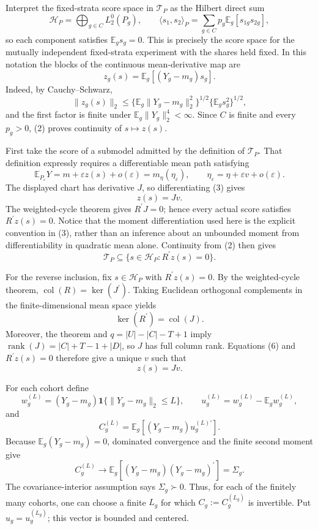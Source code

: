 Interpret the fixed-strata score space in \(\mathcal T_P\) as the Hilbert direct sum
\[
\mathcal H_P=\bigoplus_{g\in C}L_2^0(P_g),
\qquad
\langle s_1,s_2\rangle_P
=\sum_{g\in C}p_g\mathbb E_g[s_{1g}s_{2g}],
\]
so each component satisfies \(\mathbb E_gs_g=0\).  This is precisely the score space for the mutually independent fixed-strata experiment with the shares held fixed.  In this notation the blocks of the continuous mean-derivative map are
\[
z_g(s)=\mathbb E_g[(Y_g-m_g)s_g].                                      \tag{1}
\]
Indeed, by Cauchy--Schwarz,
\[
\|z_g(s)\|_2
\le \{\mathbb E_g\|Y_g-m_g\|_2^2\}^{1/2}
     \{\mathbb E_gs_g^2\}^{1/2},                                      \tag{2}
\]
and the first factor is finite under \(\mathbb E_g\|Y_g\|_2^4<\infty\).  Since \(C\) is finite and every \(p_g>0\), (2) proves continuity of \(s\mapsto z(s)\).

First take the score of a submodel admitted by the definition of \(\mathcal T_P\).  That definition expressly requires a differentiable mean path satisfying
\[
\mathbb E_{P_\varepsilon}Y
=m+\varepsilon z(s)+o(\varepsilon)
=m_\eta(\eta_\varepsilon),
\qquad
\eta_\varepsilon=\eta+\varepsilon v+o(\varepsilon).                   \tag{3}
\]
The displayed chart has derivative \(J\), so differentiating (3) gives
\[
z(s)=Jv.                                                               \tag{4}
\]
The weighted-cycle theorem gives \(R^{\prime}J=0\); hence every actual score satisfies \(R^{\prime}z(s)=0\).  Notice that the moment differentiation used here is the explicit convention in (3), rather than an inference about an unbounded moment from differentiability in quadratic mean alone.  Continuity from (2) then gives
\[
\mathcal T_P\subseteq\{s\in\mathcal H_P:R^{\prime}z(s)=0\}.           \tag{5}
\]

For the reverse inclusion, fix \(s\in\mathcal H_P\) with \(R^{\prime}z(s)=0\).  By the weighted-cycle theorem,
\(\operatorname{col}(R)=\ker(J^{\prime})\).  Taking Euclidean orthogonal complements in the finite-dimensional mean space yields
\[
\ker(R^{\prime})=\operatorname{col}(J).                                \tag{6}
\]
Moreover, the theorem and \(q=|U|-|C|-T+1\) imply
\(\operatorname{rank}(J)=|C|+T-1+|D|\), so \(J\) has full column rank.  Equations (6) and \(R^{\prime}z(s)=0\) therefore give a unique \(v\) such that
\[
z(s)=Jv.                                                               \tag{7}
\]

For each cohort define
\[
w_g^{(L)}=(Y_g-m_g)\mathbf 1\{\|Y_g-m_g\|_2\le L\},
\qquad
u_g^{(L)}=w_g^{(L)}-\mathbb E_gw_g^{(L)},
\]
and
\[
C_g^{(L)}=\mathbb E_g[(Y_g-m_g)u_g^{(L)\prime}].                        \tag{8}
\]
Because \(\mathbb E_g(Y_g-m_g)=0\), dominated convergence and the finite second moment give
\[
C_g^{(L)}\longrightarrow
\mathbb E_g[(Y_g-m_g)(Y_g-m_g)^{\prime}]=\Sigma_g.                     \tag{9}
\]
The covariance-interior assumption says \(\Sigma_g\succ0\).  Thus, for each of the finitely many cohorts, one can choose a finite \(L_g\) for which
\(C_g:=C_g^{(L_g)}\) is invertible.  Put \(u_g=u_g^{(L_g)}\); this vector is bounded and centered.

